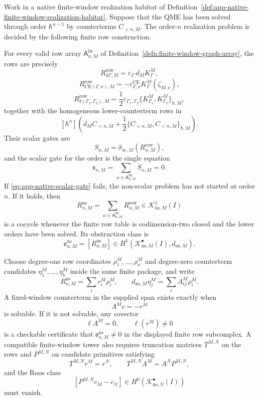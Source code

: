 \begin{thm}
\label{thm:app-constructive-nonscalar-costello-qme-realization}
  Work in a native finite-window realization habitat of
  Definition~\ref{def:app-native-finite-window-realization-habitat}.
  Suppose that the QME has been solved through order \(\hbar^{n-1}\) by
  counterterms \(C_{<n,M}\).  The order-\(n\) realization problem is
  decided by the following finite row construction.

  For every valid row array
  \(\mathsf A^{\mathrm{fw}}_{n,M}\) of
  Definition~\ref{defn:finite-window-graph-array}, the rows are precisely
  \[
    R^{\mathrm{row}}_{d\Gamma,M}
      =
    \varepsilon_\Gamma\,d_M K^M_\Gamma,
  \]
  \[
    R^{\mathrm{row}}_{\mathrm{CE}(\Gamma,\nu),M}
      =
    -\varepsilon^{\mathrm{CE}}_{\Gamma,\nu}
      K^M_\Gamma(\zeta_{M,\nu}),
  \]
  \[
    R^{\mathrm{row}}_{b(\Gamma_1,\Gamma_2),M}
      =
    \frac12\varepsilon_{\Gamma_1,\Gamma_2}
      \{K^M_{\Gamma_1},K^M_{\Gamma_2}\}_{\hbar,M},
  \]
  together with the homogeneous lower-counterterm rows in
  \[
    [\hbar^n]\left(
      d_M C_{<n,M}
      +\frac12\{C_{<n,M},C_{<n,M}\}_{\hbar,M}
    \right).
  \]
  Their scalar gates are
  \[
    S_{\alpha,M}
      =
    \widehat\sigma_{\mathrm{sc},M}
      (R^{\mathrm{row}}_{\alpha,M}),
  \]
  and the scalar gate for the order is the single equation
  \[
    \mathfrak s_{n,M}
      =
    \sum_{\alpha\in\mathsf A^{\mathrm{fw}}_{n,M}}S_{\alpha,M}=0.
    \label{eq:app-native-scalar-gate}
  \]
  If \eqref{eq:app-native-scalar-gate} fails, the non-scalar problem has
  not started at order \(n\).  If it holds, then
  \[
    R^{\mathrm{ns}}_{n,M}
      =
    \sum_{\alpha\in\mathsf A^{\mathrm{fw}}_{n,M}}
      R^{\mathrm{row}}_{\alpha,M}
      \in \mathcal K^1_{\mathrm{ns},M}(I)
  \]
  is a cocycle whenever the finite row table is codimension-two closed and
  the lower orders have been solved.  Its obstruction class is
  \[
    \mathfrak o^{\mathrm{ns}}_{n,M}
      =
    [R^{\mathrm{ns}}_{n,M}]
      \in
    H^1(\mathcal K^\bullet_{\mathrm{ns},M}(I),d_{\mathrm{ns},M}).
  \]

  Choose degree-one row coordinates
  \(\rho^M_1,\ldots,\rho^M_a\) and degree-zero counterterm candidates
  \(\eta^M_1,\ldots,\eta^M_b\) inside the same finite package, and write
  \[
    R^{\mathrm{ns}}_{n,M}=\sum_i r^M_i\rho^M_i,
    \qquad
    d_{\mathrm{ns},M}\eta^M_j=\sum_i A^M_{ij}\rho^M_i .
  \]
  A fixed-window counterterm in the supplied span exists exactly when
  \[
    A^M c=-r^M
    \label{eq:app-native-counterterm-linear-system}
  \]
  is solvable.  If it is not solvable, any covector
  \[
    \ell A^M=0,\qquad \ell(r^M)\neq0
  \]
  is a checkable certificate that
  \(\mathfrak o^{\mathrm{ns}}_{n,M}\neq0\) in the displayed finite row
  subcomplex.  A compatible finite-window tower also requires truncation
  matrices \(T^{M,N}\) on the rows and \(P^{M,N}\) on candidate primitives
  satisfying
  \[
    T^{M,N}r^M=r^N,\qquad
    T^{M,N}A^M=A^N P^{M,N},
  \]
  and the Roos class
  \[
    [P^{M,N}c_M-c_N]\in
    H^0(\mathcal K^\bullet_{\mathrm{ns},N}(I))
  \]
  must vanish.


\end{thm}
